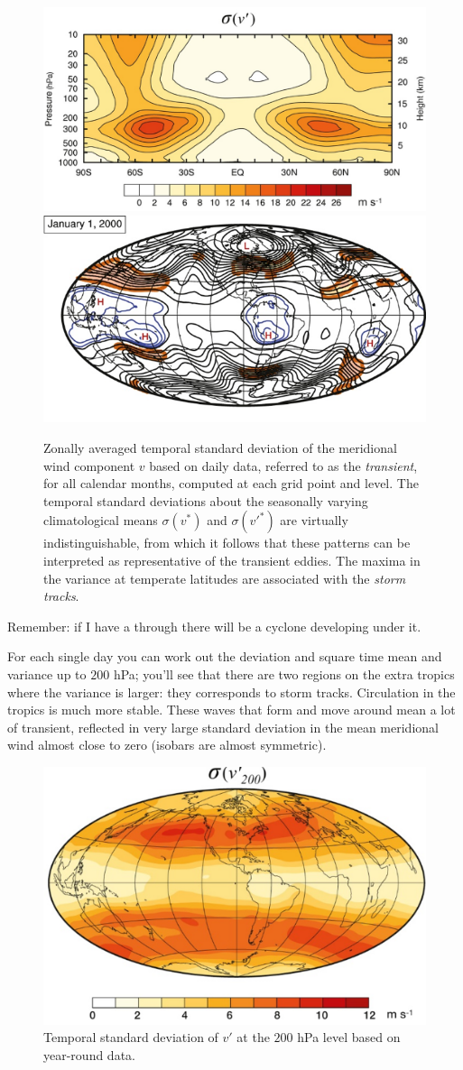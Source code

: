 \begin{figure}[h]
    \centering
    \includegraphics[width=0.5\linewidth]{uploads/sigma vtrans.png}\includegraphics[width=0.5\linewidth]{uploads/sigma vtrans world.png}
    \caption{Zonally averaged temporal standard deviation of the meridional wind component $v$ based on daily data, referred to as the \emph{transient}, for all calendar months, computed at each grid point and level. The temporal standard deviations about the seasonally varying climatological means $\sigma(v^*)$ and $\sigma(v'^*)$ are virtually indistinguishable, from which it follows that these patterns can be interpreted as representative of the transient eddies. The maxima in the variance at temperate latitudes are associated with the \emph{storm tracks}.}
    \label{fig:sigma vtrans}
\end{figure}

Remember: if I have a through there will be a cyclone developing under it.

For each single day you can work out the deviation and square time mean and variance up to $200$ hPa; you'll see that there are two regions on the extra tropics where the variance is larger: they corresponds to storm tracks. Circulation in the tropics is much more stable. These waves that form and move around mean a lot of transient, reflected in very large standard deviation in the mean meridional wind almost close to zero (isobars are almost symmetric). 
\begin{figure}[h]
    \centering
    \includegraphics[width=0.5\linewidth]{uploads/sigma v(200).png}
    \caption{Temporal standard deviation of $v'$ at the $200$ hPa level based on year-round data.}
    \label{fig:sigma v'}
\end{figure}


